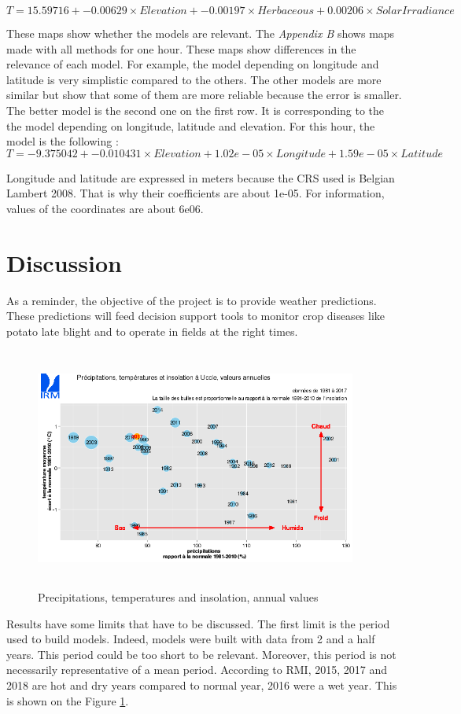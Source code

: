 \documentclass[12pt,twoside]{reedthesis}
\theoremstyle{definition}
\theoremstyle{definition}
\theoremstyle{definition}
\theoremstyle{remark}
\begin{document}
\[
T = 15.59716 + -0.00629 \times Elevation + -0.00197 \times Herbaceous + 0.00206 \times SolarIrradiance
\]

These maps show whether the models are relevant. The \emph{Appendix B}
shows maps made with all methods for one hour. These maps show
differences in the relevance of each model. For example, the model
depending on longitude and latitude is very simplistic compared to the
others. The other models are more similar but show that some of them are
more reliable because the error is smaller. The better model is the
second one on the first row. It is corresponding to the the model
depending on longitude, latitude and elevation. For this hour, the model
is the following : \[
T = -9.375042 + -0.010431 \times Elevation + 1.02e-05 \times Longitude + 1.59e-05 \times Latitude
\]

Longitude and latitude are expressed in meters because the CRS used is
Belgian Lambert 2008. That is why their coefficients are about 1e-05.
For information, values of the coordinates are about 6e06.

\section{Discussion}\label{discussion}

As a reminder, the objective of the project is to provide weather
predictions. These predictions will feed decision support tools to
monitor crop diseases like potato late blight and to operate in fields
at the right times.
\begin{figure}

{\centering \includegraphics[width=400px,height=300px]{figure/rmi_climate_data} 

}

\caption{Precipitations, temperatures and insolation, annual values}\label{fig:rmi}
\end{figure}
Results have some limits that have to be discussed. The first limit is
the period used to build models. Indeed, models were built with data
from 2 and a half years. This period could be too short to be relevant.
Moreover, this period is not necessarily representative of a mean
period. According to RMI, 2015, 2017 and 2018 are hot and dry years
compared to normal year, 2016 were a wet year. This is shown on the
Figure \ref{fig:rmi}.
\end{document}
